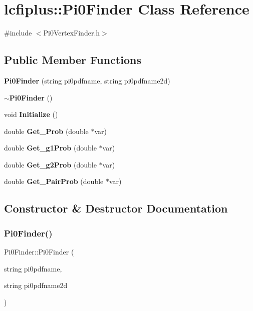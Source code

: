 \section{lcfiplus\+:\+:Pi0\+Finder Class Reference}
\label{classlcfiplus_1_1Pi0Finder}


{\ttfamily \#include $<$Pi0\+Vertex\+Finder.\+h$>$}

\subsection*{Public Member Functions}
\begin{DoxyCompactItemize}
\item 
\textbf{ Pi0\+Finder} (string pi0pdfname, string pi0pdfname2d)
\item 
\textbf{ $\sim$\+Pi0\+Finder} ()
\item 
void \textbf{ Initialize} ()
\item 
double \textbf{ Get\+\_\+\+Prob} (double $\ast$var)
\item 
double \textbf{ Get\+\_\+g1\+Prob} (double $\ast$var)
\item 
double \textbf{ Get\+\_\+g2\+Prob} (double $\ast$var)
\item 
double \textbf{ Get\+\_\+\+Pair\+Prob} (double $\ast$var)
\end{DoxyCompactItemize}


\subsection{Constructor \& Destructor Documentation}
\mbox{\label{classlcfiplus_1_1Pi0Finder_ae06b0fb50373ff1f3ae258d1e7d17352}} 
\subsubsection{Pi0\+Finder()}
{\footnotesize\ttfamily Pi0\+Finder\+::\+Pi0\+Finder (\begin{DoxyParamCaption}\item[{string}]{pi0pdfname,  }\item[{string}]{pi0pdfname2d }\end{DoxyParamCaption})}

\mbox{\label{classlcfiplus_1_1Pi0Finder_a7d92548626b111a3523669aa58ab0966}} 
